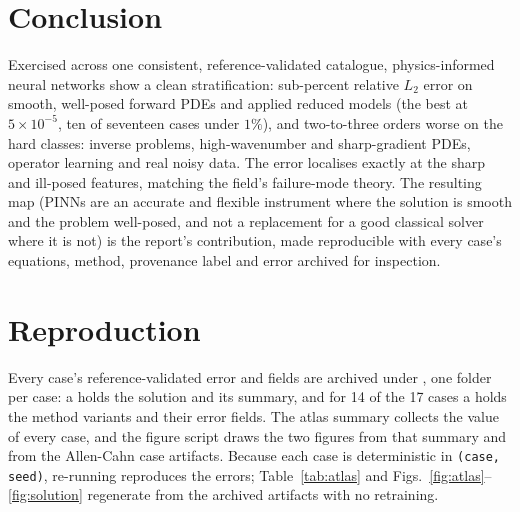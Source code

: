 \documentclass[journal]{IEEEtran}
\begin{document}
\section{Conclusion}

Exercised across one consistent, reference-validated catalogue, physics-informed neural networks show a clean
stratification: sub-percent relative $L_2$ error on smooth, well-posed forward PDEs and applied reduced models
(the best at $5\times10^{-5}$, ten of seventeen cases under $1\%$), and two-to-three orders worse on the hard
classes: inverse problems, high-wavenumber and sharp-gradient PDEs, operator learning and real noisy data. The
error localises exactly at the sharp and ill-posed features, matching the field's failure-mode theory. The
resulting map (PINNs are an accurate and flexible instrument where the solution is smooth and the problem
well-posed, and not a replacement for a good classical solver where it is not) is the report's contribution, made
reproducible with every case's equations, method, provenance label and error archived for inspection.

\appendices
\section{Reproduction}\label{app:repro}

{\raggedright
Every case's reference-validated error and fields are archived under , one folder per
case: a  holds the solution and its  summary, and for 14 of the 17 cases a
 holds the method variants and their error fields. The atlas summary
 collects the  value of every case, and the figure
script  draws the two figures from that summary and from the
Allen-Cahn case artifacts. Because
each case is deterministic in \texttt{(case, seed)}, re-running reproduces the errors; Table~\ref{tab:atlas} and
Figs.~\ref{fig:atlas}--\ref{fig:solution} regenerate from the archived artifacts with no retraining.\par}

\balance
\end{document}
